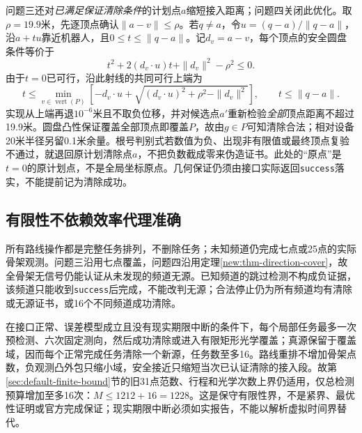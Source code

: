 问题三还对\emph{已满足保证清除条件}的计划点$a$缩短接入距离；问题四关闭此优化。取$\rho=19.9$米，先逐顶点确认$\|a-v\|\le\rho$。若$q\ne a$，令$u=(q-a)/\|q-a\|$，沿$a+tu$靠近机器人，且$0\le t\le\|q-a\|$。记$d_v=a-v$，每个顶点的安全圆盘条件等价于
\begin{equation}
 t^2+2(d_v\cdot u)t+\|d_v\|^2-\rho^2\le0.
 \label{field:eq-clear-quadratic}
\end{equation}
由于$t=0$已可行，沿此射线的共同可行上端为
\begin{equation}
 t\le\min_{v\in\operatorname{vert}(P)}
 \left[-d_v\cdot u+
 \sqrt{(d_v\cdot u)^2+\rho^2-\|d_v\|^2}\right],
 \qquad t\le\|q-a\|.
 \label{field:eq-clear-approach}
\end{equation}
实现从上端再退$10^{-6}$米且不取负位移，并对候选点$a'$重新检验\emph{全部}顶点距离不超过19.9米。圆盘凸性保证覆盖全部顶点即覆盖$P$，故由$g\in P$可知清除合法；相对设备20米半径另留0.1米余量。根号判别式若数值为负、出现非有限值或最终顶点复验不通过，就退回原计划清除点$a$，不把负数截成零来伪造证书。此处的“原点”是$t=0$的原计划点，不是全局坐标原点。几何保证仍须由接口实际返回\texttt{success}落实，不能提前记为清除成功。

\subsection{有限性不依赖效率代理准确}
\label{field:sec-finite}
所有路线操作都是完整任务排列，不删除任务；未知频道仍完成七点或25点的实际骨架观测。问题三沿用七点覆盖，问题四沿用定理\ref{new:thm-direction-cover}，故全骨架无信号仍能认证从未发现的频道无源。已知频道的跳过检测不构成负证据，该频道只能收到\texttt{success}后完成，不能改判无源；合法停止仍为所有频道均有清除或无源证书，或16个不同频道成功清除。

在接口正常、误差模型成立且没有现实期限中断的条件下，每个局部任务最多一次预检测、六次固定测向，然后成功清除或进入有限矩形光学覆盖；真源保留于覆盖域，因而每个正常完成任务清除一个新源，任务数至多16。路线重排不增加骨架点数，负观测凸外包只缩小域，安全接近只缩短当次已认证清除的接入段。故第\ref{sec:default-finite-bound}节的旧31点范数、行程和光学次数上界仍适用，仅总检测预算增加至多16次：$M\le1212+16=1228$。这是保守有限性界，不是紧界、最优性证明或官方完成保证；现实期限中断必须如实报告，不能以解析虚拟时间界替代。
